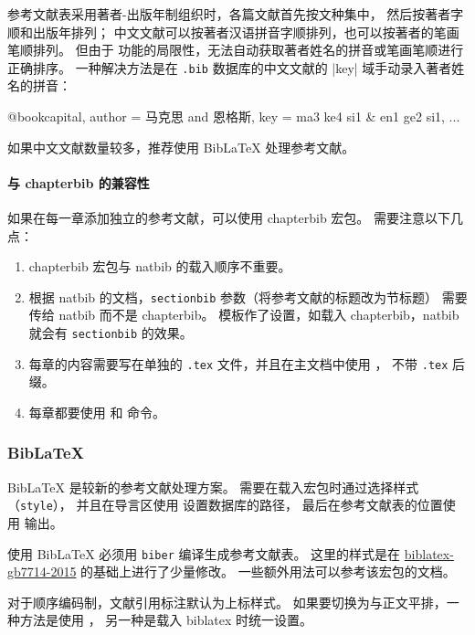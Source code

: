 \documentclass[a4paper]{ltxdoc}
\DeclareRobustCommand\file{\nolinkurl}
\DeclareRobustCommand\pkg{\textsf}
\DeclareRobustCommand\opt{\texttt}
\begin{document}
参考文献表采用著者-出版年制组织时，各篇文献首先按文种集中， 然后按著者字顺和出版年排列；
中文文献可以按著者汉语拼音字顺排列，也可以按著者的笔画笔顺排列。
但由于 \BibTeX{} 功能的局限性，无法自动获取著者姓名的拼音或笔画笔顺进行正确排序。
一种解决方法是在 \file{.bib} 数据库的中文文献的 |key| 域手动录入著者姓名的拼音：
\begin{latex}
  @book{capital,
    author = {马克思 and 恩格斯},
    key    = {ma3 ke4 si1 & en1 ge2 si1},
    ...
  }
\end{latex}
如果中文文献数量较多，推荐使用 BibLaTeX 处理参考文献。

\paragraph{与 \pkg{chapterbib} 的兼容性}
如果在每一章添加独立的参考文献，可以使用 \pkg{chapterbib} 宏包。
需要注意以下几点：
\begin{enumerate}
  \item \pkg{chapterbib} 宏包与 \pkg{natbib} 的载入顺序不重要。
  \item 根据 \pkg{natbib} 的文档，\opt{sectionbib} 参数（将参考文献的标题改为节标题）
    需要传给 \pkg{natbib} 而不是 \pkg{chapterbib}。
    模板作了设置，如载入 \pkg{chapterbib}，\pkg{natbib} 就会有 \opt{sectionbib} 的效果。
  \item 每章的内容需要写在单独的 \file{.tex} 文件，并且在主文档中使用 ，
    不带 \file{.tex} 后缀。
  \item 每章都要使用  和  命令。
\end{enumerate}


\subsubsection{BibLaTeX}

BibLaTeX 是较新的参考文献处理方案。
需要在载入宏包时通过选择样式（\opt{style}），
并且在导言区使用  设置数据库的路径，
最后在参考文献表的位置使用  输出。
\begin{latex}
  \usepackage[style=ustcthesis-authoryear]{biblatex}
  
\end{latex}
使用 BibLaTeX 必须用 \file{biber} 编译生成参考文献表。
这里的样式是在 \href{https://ctan.org/pkg/biblatex-gb7714-2015}{biblatex-gb7714-2015}
的基础上进行了少量修改。
一些额外用法可以参考该宏包的文档。

对于顺序编码制，文献引用标注默认为上标样式。
如果要切换为与正文平排，一种方法是使用 ，
另一种是载入 \pkg{biblatex} 时统一设置。
\begin{latex}
  \usepackage[style=ustcthesis-numeric, inline=true]{biblatex}
\end{latex}
\end{document}
